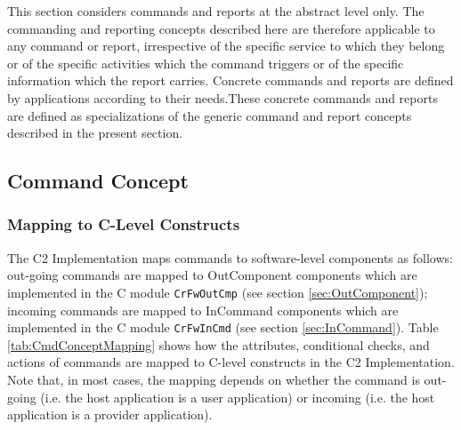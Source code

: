 \documentclass{pnp_article}
\begin{document}
This section considers commands and reports at the abstract level only. The commanding and reporting concepts described here are therefore applicable to any command or report, irrespective of the specific service to which they belong or of the specific activities which the command triggers or of the specific information which the report carries. Concrete commands and reports are defined by applications according to their needs.These concrete commands and reports are defined as specializations of the generic command and report concepts described in the present section. 

\subsection{Command Concept }\label{sec:CmdConcept}


\subsubsection{Mapping to C-Level Constructs}\label{sec:CmdConceptMapping}
The C2 Implementation maps commands to software-level components as follows: out-going commands are mapped to OutComponent components which are implemented in the C module \texttt{CrFwOutCmp} (see section \ref{sec:OutComponent}); incoming commands are mapped to InCommand components which are implemented in the C module \texttt{CrFwInCmd} (see section \ref{sec:InCommand}). Table \ref{tab:CmdConceptMapping} shows how the attributes, conditional checks, and actions of commands are mapped to C-level constructs in the C2 Implementation. Note that, in most cases, the mapping depends on whether the command is out-going (i.e. the host application is a user application) or incoming (i.e. the host application is a provider application).
\end{document}
